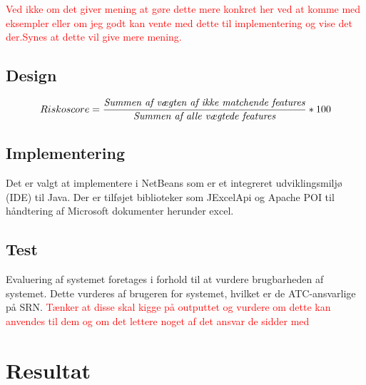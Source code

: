 \textcolor{red}{Ved ikke om det giver mening at gøre dette mere konkret her ved at komme med eksempler eller om jeg godt kan vente med dette til implementering og vise det der.Synes at dette vil give mere mening.}

\section{Design}

\begin{equation}
Riskoscore = \frac{\mbox{\textit{Summen af vægten af ikke matchende features}}}{\mbox{\textit{Summen af alle vægtede features}}} * 100
\end{equation}



\section{Implementering}
Det er valgt at implementere i NetBeans som er et integreret udviklingsmiljø (IDE) til Java. Der er tilføjet biblioteker som JExcelApi og Apache POI til håndtering af Microsoft dokumenter herunder excel.

\section{Test}
Evaluering af systemet foretages i forhold til at vurdere brugbarheden af systemet. Dette vurderes af brugeren for systemet, hvilket er de ATC-ansvarlige på SRN. \textcolor{red}{Tænker at disse skal kigge på outputtet og vurdere om dette kan anvendes til dem og om det lettere noget af det ansvar de sidder med}

\chapter{Resultat}



